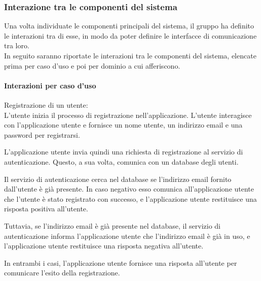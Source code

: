 \subsubsection{Interazione tra le componenti del sistema}
Una volta individuate le componenti principali del sistema, il gruppo ha definito le interazioni tra di esse, in modo da poter definire le interfacce di comunicazione tra loro.\\
In seguito saranno riportate le interazioni tra le componenti del sistema, elencate prima per caso d'uso e poi per dominio a cui afferiscono.\\

\paragraph{Interazioni per caso d'uso}
Registrazione di un utente:\\
L'utente inizia il processo di registrazione nell'applicazione. L'utente interagisce con l'applicazione utente e fornisce un nome utente, un indirizzo email e una password per registrarsi.

L'applicazione utente invia quindi una richiesta di registrazione al servizio di autenticazione. Questo, a sua volta, comunica con un database degli utenti.

Il servizio di autenticazione cerca nel database se l'indirizzo email fornito dall'utente è già presente. In caso negativo esso comunica all'applicazione utente che l'utente è stato registrato con successo, e l'applicazione utente restituisce una risposta positiva all'utente.

Tuttavia, se l'indirizzo email è già presente nel database, il servizio di autenticazione informa l'applicazione utente che l'indirizzo email è già in uso, e l'applicazione utente restituisce una risposta negativa all'utente.

In entrambi i casi, l'applicazione utente fornisce una risposta all'utente per comunicare l'esito della registrazione.

